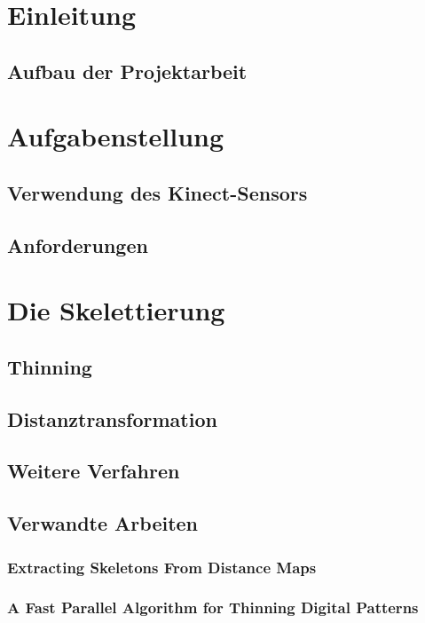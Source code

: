 \documentclass[appendixprefix,a4paper,bibliography=totoc,twoside=true,11pt,DIV=11,BCOR=6mm,headsepline,pointlessnumbers]{scrbook}
\begin{document}

\maketitle
\chapter{Einleitung}
\section{Aufbau der Projektarbeit}
\chapter{Aufgabenstellung}
\section{Verwendung des Kinect-Sensors}
\section{Anforderungen}

\chapter{Die Skelettierung}
\section{Thinning}
\section{Distanztransformation}
\section{Weitere Verfahren}
\section{Verwandte Arbeiten}
\subsection{Extracting Skeletons From Distance Maps}
\subsection{A Fast Parallel Algorithm for Thinning Digital Patterns} 
\end{document}
